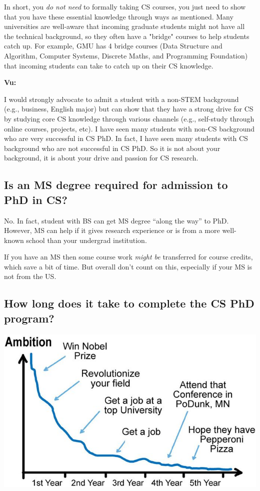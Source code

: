 \documentclass[11pt]{article}
\newenvironment{commentbox}[1][]{
\small
    \begin{mybox}
    {\small \textbf{#1}}
 }{
   \end{mybox}
}
\begin{document}
In short, you \emph{do not need} to formally taking CS courses, you just need to show that you have these essential knowledge through ways as mentioned. Many universities are well-aware that incoming graduate students might not have all the technical background, so they often have a "bridge" courses to help students catch up.  For example, GMU has 4 bridge courses (Data Structure and Algorithm, Computer Systems, Discrete Maths, and Programming Foundation) that incoming students can take to catch up on their CS knowledge.

\begin{commentbox}[Vu:]
    I would strongly advocate to admit a student with a non-STEM background (e.g., business, English major) but can show that they have a strong drive for CS by studying core CS knowledge through various channels (e.g., self-study through online courses, projects, etc).  I have seen many students with non-CS background who are very successful in CS PhD.  In fact, I have seen many students with CS background who are not successful in CS PhD.  So it is not about your background, it is about your drive and passion for CS research.    \end{commentbox}

\subsection{Is an MS degree required for admission to PhD in CS?}\label{sec:msrequirement}
No. In fact, student with BS can get MS degree ``along the way'' to PhD.  However, MS can help if it gives research experience or is from a more well-known school than your undergrad institution. 

If you have an MS then some course work \emph{might be} transferred for course credits, which save a bit of time. But overall don't count on this, especially if your MS is not from the US. 


\subsection{How long does it take to complete the CS PhD program?}\label{sec:time}


\begin{center}
\includegraphics[scale=0.3]{c4a.png}
\end{center}
\end{document}

